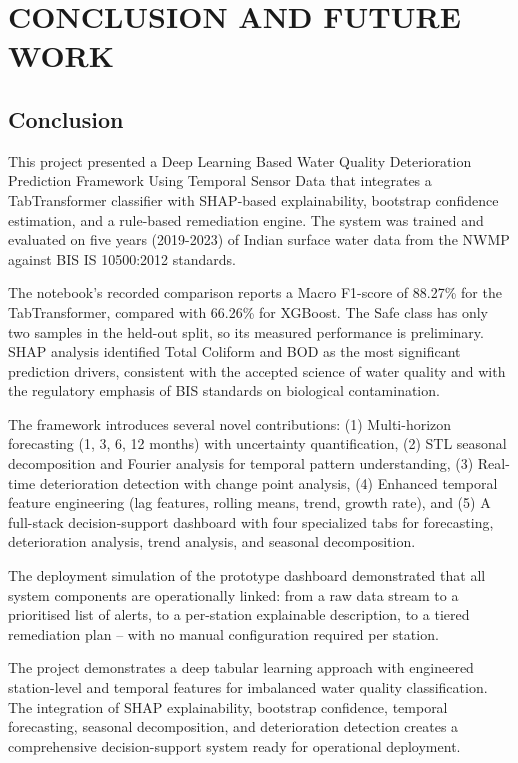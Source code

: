 \documentclass[12pt,a4paper]{report}
\numberwithin{table}{chapter}
\numberwithin{figure}{chapter}
\begin{document}
\chapter{CONCLUSION AND FUTURE WORK}
\label{ch:conclusion}

\section{Conclusion}

This project presented a Deep Learning Based Water Quality Deterioration Prediction
Framework Using Temporal Sensor Data that integrates a TabTransformer classifier with
SHAP-based explainability, bootstrap confidence estimation, and a rule-based remediation
engine. The system was trained and evaluated on five years (2019-2023) of Indian surface
water data from the NWMP against BIS IS 10500:2012 standards.

The notebook's recorded comparison reports a Macro F1-score of 88.27\% for the
TabTransformer, compared with 66.26\% for XGBoost. The Safe class has only two samples
in the held-out split, so its measured performance is preliminary. SHAP analysis
identified Total Coliform and BOD as the most
significant prediction drivers, consistent with the accepted science of water quality
and with the regulatory emphasis of BIS standards on biological contamination.

The framework introduces several novel contributions: (1) Multi-horizon forecasting
(1, 3, 6, 12 months) with uncertainty quantification, (2) STL seasonal decomposition
and Fourier analysis for temporal pattern understanding, (3) Real-time deterioration
detection with change point analysis, (4) Enhanced temporal feature engineering (lag
features, rolling means, trend, growth rate), and (5) A full-stack decision-support
dashboard with four specialized tabs for forecasting, deterioration analysis, trend
analysis, and seasonal decomposition.

The deployment simulation of the prototype dashboard demonstrated that all system
components are operationally linked: from a raw data stream to a prioritised list of
alerts, to a per-station explainable description, to a tiered remediation plan -- with
no manual configuration required per station.

The project demonstrates a deep tabular learning approach with engineered
station-level and temporal features for imbalanced water quality classification.
The integration of SHAP explainability, bootstrap confidence, temporal forecasting,
seasonal decomposition, and deterioration detection creates a comprehensive
decision-support system ready for operational deployment.
\end{document}
